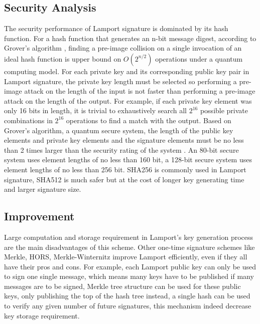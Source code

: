 \documentclass[10pt,sigconf]{acmart}
\begin{document}
\subsection{Security Analysis}

The security performance of Lamport signature is dominated by its hash function. For a hash function that generates an n-bit message digest, according to Grover's algorithm \cite{8463331}, finding a pre-image collision on a single invocation of an ideal hash function is upper bound on $Ο(2^{n/2})$ operations under a quantum computing model. For each private key and its corresponding public key pair in Lamport signature, the private key length must be selected so performing a pre-image attack on the length of the input is not faster than performing a pre-image attack on the length of the output. For example, if each private key element was only 16 bits in length, it is trivial to exhaustively search all $2^{16}$ possible private combinations in $2^{16}$ operations to find a match with the output. Based on Grover's algorithm, a quantum secure system, the length of the public key elements and private key elements and the signature elements must be no less than 2 times larger than the security rating of the system \cite{4897262}. An 80-bit secure system uses element lengths of no less than 160 bit, a 128-bit secure system uses element lengths of no less than 256 bit. SHA256 is commonly used in Lamport signature, SHA512 is much safer but at the cost of longer key generating time and larger signature size. 

\subsection{Improvement}

Large computation and storage requirement in Lamport's key generation process are the main disadvantages of this scheme. Other one-time signature schemes like Merkle, HORS, Merkle-Winternitz improve Lamport efficiently, even if they all have their pros and cons. For example, each Lamport public key can only be used to sign one single message, which means many keys have to be published if many messages are to be signed, Merkle tree structure can be used for these public keys, only publishing the top of the hash tree instead, a single hash can be used to verify any given number of future signatures, this mechanism indeed decrease key storage requirement.




\end{document}
